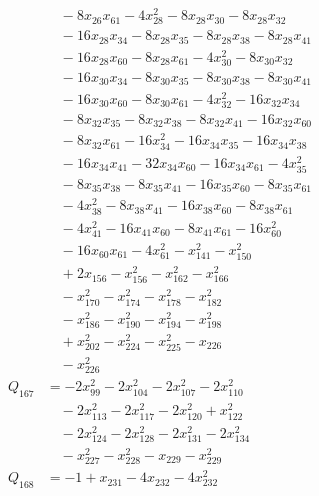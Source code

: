 \begin{align*}
&\quad -8x_{26}x_{61}-4x_{28}^{2}-8x_{28}x_{30}-8x_{28}x_{32}\\
&\quad -16x_{28}x_{34}-8x_{28}x_{35}-8x_{28}x_{38}-8x_{28}x_{41}\\
&\quad -16x_{28}x_{60}-8x_{28}x_{61}-4x_{30}^{2}-8x_{30}x_{32}\\
&\quad -16x_{30}x_{34}-8x_{30}x_{35}-8x_{30}x_{38}-8x_{30}x_{41}\\
&\quad -16x_{30}x_{60}-8x_{30}x_{61}-4x_{32}^{2}-16x_{32}x_{34}\\
&\quad -8x_{32}x_{35}-8x_{32}x_{38}-8x_{32}x_{41}-16x_{32}x_{60}\\
&\quad -8x_{32}x_{61}-16x_{34}^{2}-16x_{34}x_{35}-16x_{34}x_{38}\\
&\quad -16x_{34}x_{41}-32x_{34}x_{60}-16x_{34}x_{61}-4x_{35}^{2}\\
&\quad -8x_{35}x_{38}-8x_{35}x_{41}-16x_{35}x_{60}-8x_{35}x_{61}\\
&\quad -4x_{38}^{2}-8x_{38}x_{41}-16x_{38}x_{60}-8x_{38}x_{61}\\
&\quad -4x_{41}^{2}-16x_{41}x_{60}-8x_{41}x_{61}-16x_{60}^{2}\\
&\quad -16x_{60}x_{61}-4x_{61}^{2}-x_{141}^{2}-x_{150}^{2}\\
&\quad +2x_{156}-x_{156}^{2}-x_{162}^{2}-x_{166}^{2}\\
&\quad -x_{170}^{2}-x_{174}^{2}-x_{178}^{2}-x_{182}^{2}\\
&\quad -x_{186}^{2}-x_{190}^{2}-x_{194}^{2}-x_{198}^{2}\\
&\quad +x_{202}^{2}-x_{224}^{2}-x_{225}^{2}-x_{226}\\
&\quad -x_{226}^{2}\\
Q_{167}&=-2x_{99}^{2}-2x_{104}^{2}-2x_{107}^{2}-2x_{110}^{2}\\
&\quad -2x_{113}^{2}-2x_{117}^{2}-2x_{120}^{2}+x_{122}^{2}\\
&\quad -2x_{124}^{2}-2x_{128}^{2}-2x_{131}^{2}-2x_{134}^{2}\\
&\quad -x_{227}^{2}-x_{228}^{2}-x_{229}-x_{229}^{2}\\
Q_{168}&=-1+x_{231}-4x_{232}-4x_{232}^{2}\\
\end{align*}
\endgroup
